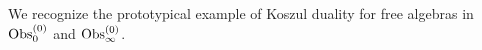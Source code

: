 \documentclass[11pt]{amsart}
\def\brian#1{{\textcolor{blue!65!red}{BRW: {#1}}}}
\begin{document}
We recognize the prototypical example of Koszul duality for free algebras in ${\rm Obs}_0^{(0)}$ and ${\rm Obs}_\infty^{(0)}$. 


%
%
%
%
%
%
%
%
%
%
%
\end{document}
